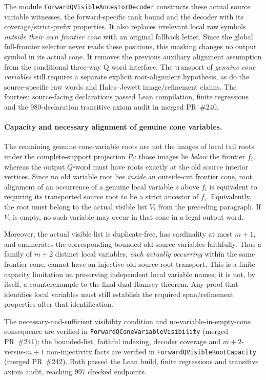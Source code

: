 \documentclass[11pt]{article}
\begin{document}
The module \texttt{ForwardQVisibleAncestorDecoder}
constructs these actual source variable witnesses,
the forward-specific rank bound and the decoder
with its coverage/strict-prefix properties.
It also replaces irrelevant local raw symbols
\emph{outside their own frontier cone} with
an original fallback letter. Since the global
full-frontier selector never reads these positions,
this masking changes no output symbol in its
actual cone. It removes the previous auxiliary
alignment assumption from the conditional
three-way Q word interface. The transport of
\emph{genuine cone variables} still requires a
separate explicit root-alignment hypothesis,
as do the source-specific raw words and
Hales--Jewett image/refinement claims.
The fourteen source-facing declarations passed Lean compilation,
finite regressions and the 980-declaration transitive axiom audit
in merged PR~\#240.


\paragraph{Capacity and necessary alignment of genuine cone variables.}
The remaining genuine cone-variable roots are not the
images of local tail roots under the complete-support
projection \(P_i\): those images lie \emph{below}
the frontier \(f_i\), whereas the output \(Q\)-word
must have roots exactly at the old source interior
vertices. Since no old variable root lies \emph{inside}
an outside-cut frontier cone, root alignment of
an occurrence of a genuine local variable \(z\)
above \(f_i\) is equivalent to requiring its
transported source root to be a strict ancestor
of \(f_i\). Equivalently, the root must belong
to the actual visible list \(V_i\) from the preceding
paragraph. If \(V_i\) is empty, no such variable
may occur in that cone in a legal output word.

Moreover, the actual visible list is duplicate-free,
has cardinality at most \(m+1\), and enumerates
the corresponding bounded old source variables
faithfully. Thus a family of \(m+2\) distinct
local variables, \emph{each actually occurring}
within the same frontier cone, cannot have an
injective old-source-root transport. This is
a finite-capacity limitation on preserving
independent local variable names; it is not,
by itself, a counterexample to the final
dual Ramsey theorem. Any proof that identifies
local variables must still establish the
required span/refinement properties after
that identification.

The necessary-and-sufficient visibility condition
and no-variable-in-empty-cone consequence
are verified in
\texttt{ForwardQConeVariableVisibility}
(merged PR~\#241); the bounded-list, faithful
indexing, decoder coverage and
\(m+2\)-versus-\(m+1\) non-injectivity
facts are verified in
\texttt{ForwardQVisibleRootCapacity}
(merged PR~\#242). Both passed the Lean build,
finite regressions and transitive axiom audit,
reaching 997 checked endpoints.
\end{document}
